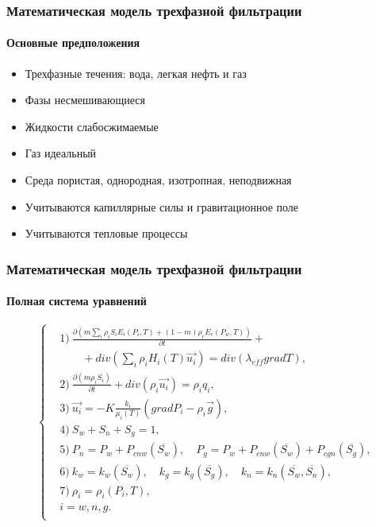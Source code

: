 \documentclass[10pt,pdf,hyperref={unicode}]{beamer} %
\begin{document}
\begin{frame}
\begin{center}
\frametitle{Математическая модель трехфазной фильтрации}
\framesubtitle{Основные предположения}
\begin{itemize}
\item Трехфазные течения: вода, легкая нефть и газ
\vspace{0.3cm}
\item Фазы несмешивающиеся
\vspace{0.3cm}
\item Жидкости слабосжимаемые
\vspace{0.3cm}
\item Газ идеальный
\vspace{0.3cm}
\item Среда пористая, однородная, изотропная, неподвижная
\vspace{0.3cm}
\item Учитываются капиллярные силы и гравитационное поле
\vspace{0.3cm}
\item Учитываются тепловые процессы
\end{itemize}
\end{center}
\end{frame}

\begin{frame}
\begin{center}
\frametitle{Математическая модель трехфазной фильтрации}
\framesubtitle{Полная система уравнений}
\begin{equation*}
\left\{
  \begin{aligned}
    & \text{1)}\ \frac{\partial \left(m {\sum\limits_{i}{\rho_i S_i E_i(P_i, T)}} + (1-m){\rho_r E_r(P_w, T)}\right)}{\partial t} + \\
    & \qquad + div(\sum_{i}{\rho_i H_i(T) \overrightarrow{u_i}}) = div(\lambda_{eff} grad T),\\
    & \text{2)}\ \frac{\partial (m \rho_i S_i)}{\partial t}+ div(\rho_i \overrightarrow{u_i}) = \rho_i q_i,\\
    & \text{3)}\ \overrightarrow{u_i}=-K \frac{k_i}{{\mu_i(T)}}(grad P_i - {\rho}_i\overrightarrow{g}),\\
    & \text{4)}\ S_w + S_n + S_g=1,\\
    & \text{5)}\ P_n=P_w+P_{cnw}(\overline{S_w}),\quad P_g=P_w+P_{cnw}(\overline{S_w})+P_{cgn}(\overline{S_g}),\\
    & \text{6)}\ k_w=k_w(\overline{S_w}),\quad k_g=k_g(\overline{S_g}),\quad k_n=k_n(\overline{S_w},\overline{S_n}),\\
    & \text{7)}\ \rho_i=\rho_i(P_i,T),\\
    &i=w,n,g. \\
  \end{aligned}
\right.
\end{equation*}
\end{center}
\end{frame}
\end{document}
